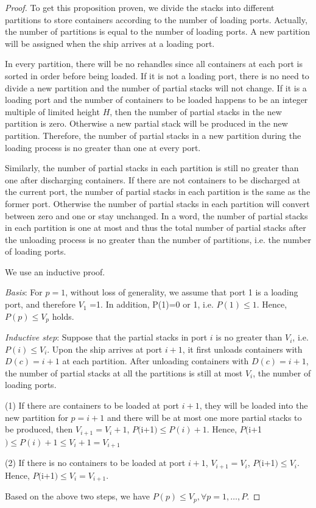 \documentclass[review,3p,times,authoryear,12pt]{elsarticle}
\begin{document}
\begin{proof}

To get this proposition proven, we divide the stacks into different partitions to store containers according to the number of loading ports.
Actually, the number of partitions is equal to the number of loading ports.
A new partition will be assigned when the ship arrives at a loading port.

In every partition, there will be no rehandles since all containers at each port is sorted in order before being loaded.
If it is not a loading port, there is no need to divide a new partition and the number of partial stacks will not change.
If it is a loading port and the number of containers to be loaded happens to be an integer multiple of limited height $H$, then the number of partial stacks in the new partition is zero.
Otherwise a new partial stack will be produced in the new partition.
Therefore, the number of partial stacks in a new partition during the loading process is no greater than one at every port.

Similarly, the number of partial stacks in each partition is still no greater than one after discharging containers.
If there are not containers to be discharged at the current port, the number of partial stacks in each partition is the same as the former port.
Otherwise the number of partial stacks in each partition will convert between zero and one or stay unchanged.
In a word, the number of partial stacks in each partition is one at most and thus the total number of partial stacks after the unloading process is no greater than the number of partitions, i.e. the number of loading ports.

We use an inductive proof.

\textit{Basis}: For $p=1$, without loss of generality, we assume that port 1 is a loading port, and therefore $V_1$ =1.
In addition, P(1)=0 or 1, i.e. $P(1) \le 1$. Hence, $P(p) \le V_p $ holds.

\textit{Inductive step}: Suppose that the partial stacks in port $i$ is no greater than $V_i$, i.e. $P(i) \le V_i $.
Upon the ship arrives at port $i+1$, it first unloads containers with $D(c)=i+1$ at each partition.
After unloading containers with $D(c)=i+1$, the number of partial stacks at all the partitions is still at most $V_i$, the number of loading ports.

(1) If there are containers to be loaded at port $i+1$, they will be loaded into the new partition for $p=i+1$ and there will be at most one more partial stacks to be produced, then $V_{i+1}=V_i+1$,  $P($i+1$) \le P(i)+1$. Hence, $P($i+1$) \le P(i)+1 \le V_i+1=V_{i+1}$

(2) If there is no containers to be loaded at port $i+1$,  $V_{i+1}=V_i$, $P($i+1$) \le V_i$. Hence, $P($i+1$) \le V_{i}=V_{i+1}$.

Based on the above two steps, we have $P(p) \le V_p,  \forall p=1,\ldots,P$.
\end{proof}
\end{document}
